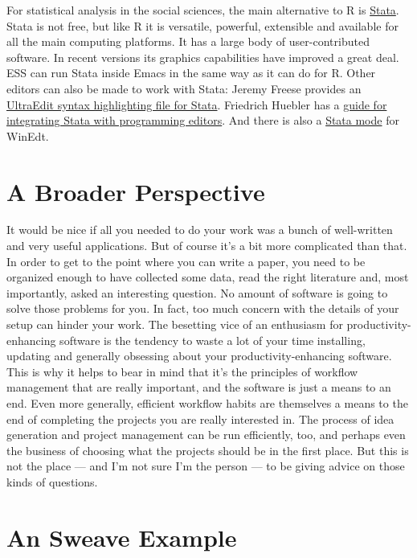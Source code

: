 \documentclass[11pt,article]{memoir}
\begin{document}
For statistical analysis in the social sciences, the main alternative to R is \href{http://www.stata.com/}{Stata}. Stata is not free, but like R it is versatile, powerful, extensible and available for all the main computing platforms. It has a large body of user-contributed software. In recent versions its graphics capabilities have improved a great deal. ESS can run Stata inside Emacs in the same way as it can do for R. Other editors can also be made to work with Stata: Jeremy Freese provides an  \href{http://www.jeremyfreese.com/#other%20research}{UltraEdit syntax highlighting file for Stata}. Friedrich Huebler has a \href{http://mysite.verizon.net/huebler/2005/20050310_Stata_editor.html}{guide for integrating Stata with programming editors}. And there is also a \href{http://www.winedt.org/Config/modes/Stata.php}{Stata mode} for WinEdt.


\chapter{A Broader Perspective} 
It would be nice if all you needed to do your work was a bunch of well-written and very useful applications. But of course it's a bit more complicated than that. In order to get to the point where you can write a paper, you need to be organized enough to have collected some data, read the right literature and, most importantly, asked an interesting question. No amount of software is going to solve those problems for you. In fact, too much concern with the details of your setup can hinder your work. The besetting vice of an enthusiasm for productivity-enhancing software is the tendency to waste a lot of your time installing, updating and generally obsessing about your productivity-enhancing software. This is why it helps to bear in mind that it's the principles of workflow management that are really important, and the software is just a means to an end. Even more generally, efficient workflow habits are themselves a means to the end of completing the projects you are really interested in. The process of idea generation and project management can be run efficiently, too, and perhaps even the business of choosing what the projects should be in the first place. But this is not the place --- and I'm not sure I'm the person --- to be giving advice on those kinds of questions.

\appendix

\chapter{An Sweave Example} %
\label{sec:an_sweave_example}
\end{document}
